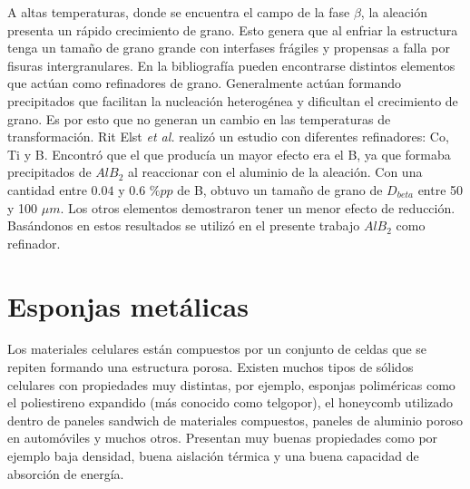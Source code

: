 \documentclass[a4paper,12pt,fleqn,twoside,openany]{book}
\begin{document}
A altas temperaturas, donde se encuentra el campo de la fase $\beta$, la aleación presenta un rápido crecimiento de grano. Esto genera que al enfriar la estructura tenga un tamaño de grano grande con interfases frágiles y propensas 
a falla por fisuras intergranulares. En la bibliografía pueden encontrarse distintos elementos que actúan como refinadores de grano. Generalmente actúan formando 
precipitados que facilitan la nucleación heterogénea y dificultan el crecimiento de grano. Es por esto que no generan un cambio en las temperaturas de 
transformación. Rit Elst \textit{et al.} \cite{ritelst} realizó un estudio con diferentes refinadores: Co, Ti y B. Encontró que el que producía un mayor efecto era el B, 
ya que formaba precipitados de $AlB_{2}$ al reaccionar con el aluminio de la aleación. Con una cantidad entre $0.04$ y $0.6$ $\%pp$ de B, obtuvo un tamaño de grano de $D_{beta}$ entre 50 y 100 $\mu m$. Los otros elementos 
demostraron tener un menor efecto de reducción. Basándonos en estos resultados se utilizó en el presente trabajo $AlB_{2}$ como refinador.
% 


\section{Esponjas metálicas}

Los materiales celulares están compuestos por un conjunto de celdas que se repiten formando una estructura porosa. Existen muchos tipos de sólidos celulares 
con propiedades muy distintas, por ejemplo, esponjas poliméricas como el poliestireno expandido (más conocido como telgopor), el honeycomb utilizado dentro 
de paneles sandwich de materiales compuestos, paneles de aluminio poroso en automóviles y muchos otros. Presentan muy buenas propiedades como por ejemplo 
baja densidad, buena aislación térmica y una buena capacidad de absorción de energía.
\end{document}
